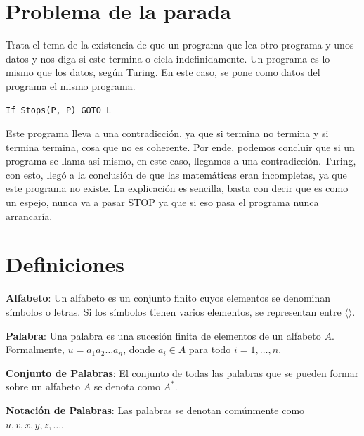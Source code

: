 \documentclass[12pt]{report} %
\begin{document}
\hypertarget{problema-de-la-parada}{%
\section{Problema de la parada}\label{problema-de-la-parada}}

Trata el tema de la existencia de que un programa que lea otro programa
y unos datos y nos diga si este termina o cicla indefinidamente. Un
programa es lo mismo que los datos, según Turing. En este caso, se pone
como datos del programa el mismo programa.

\begin{lstlisting}[language=Python]
If Stops(P, P) GOTO L
\end{lstlisting}

Este programa lleva a una contradicción, ya que si termina no termina y
si termina termina, cosa que no es coherente. Por ende, podemos concluir
que si un programa se llama así mismo, en este caso, llegamos a una
contradicción. Turing, con esto, llegó a la conclusión de que las
matemáticas eran incompletas, ya que este programa no existe. La
explicación es sencilla, basta con decir que es como un espejo, nunca va
a pasar STOP ya que si eso pasa el programa nunca arrancaría.

\hypertarget{definiciones}{%
\section{Definiciones}\label{definiciones}}

\begin{definicion}
\textbf{Alfabeto}: Un alfabeto es un conjunto finito cuyos elementos se denominan símbolos o letras. Si los símbolos tienen varios elementos, se representan entre $\langle \rangle$.  
\end{definicion}

\begin{definicion}
\textbf{Palabra}: Una palabra es una sucesión finita de elementos de un alfabeto $A$. Formalmente, $u = a_1 a_2 \ldots a_n$, donde $a_i \in A$ para todo $i = 1, \ldots, n$.  
\end{definicion}

\begin{definicion}
\textbf{Conjunto de Palabras}: El conjunto de todas las palabras que se pueden formar sobre un alfabeto $A$ se denota como $A^*$.  
\end{definicion}

\begin{definicion}
\textbf{Notación de Palabras}: Las palabras se denotan comúnmente como $u, v, x, y, z, \ldots$.  
\end{definicion}
\end{document}
